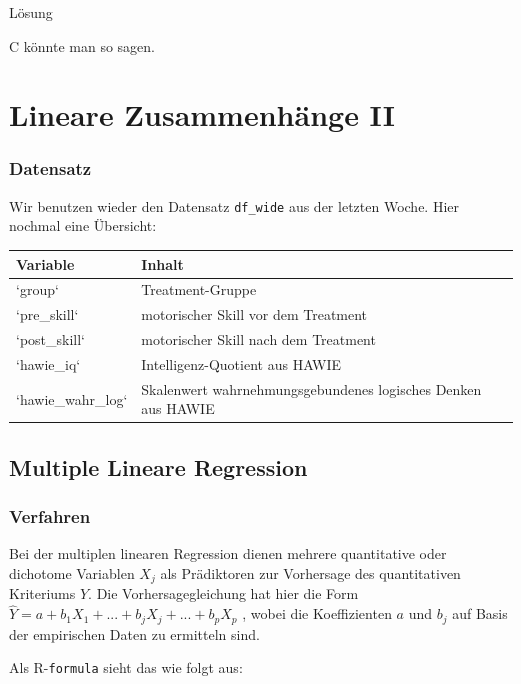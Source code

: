 \documentclass[
]{book}
\begin{document}
Lösung

C könnte man so sagen.

\hypertarget{lineare-zusammenhuxe4nge-ii}{%
\chapter{Lineare Zusammenhänge II}\label{lineare-zusammenhuxe4nge-ii}}

\hypertarget{datensatz-1}{%
\subsection{Datensatz}\label{datensatz-1}}

Wir benutzen wieder den Datensatz \texttt{df\_wide} aus der letzten Woche. Hier nochmal eine Übersicht:

\begin{tabular}[t]{ll}
\toprule
Variable & Inhalt\\
\midrule
`group` & Treatment-Gruppe\\
`pre\_skill` & motorischer Skill vor dem Treatment\\
`post\_skill` & motorischer Skill nach dem Treatment\\
`hawie\_iq` & Intelligenz-Quotient aus HAWIE\\
`hawie\_wahr\_log` & Skalenwert wahrnehmungsgebundenes 
 logisches Denken aus HAWIE\\
\bottomrule
\end{tabular}

\hypertarget{multiple-lineare-regression}{%
\section{Multiple Lineare Regression}\label{multiple-lineare-regression}}

\hypertarget{verfahren}{%
\subsection{Verfahren}\label{verfahren}}

Bei der multiplen linearen Regression dienen mehrere quantitative oder dichotome Variablen
\(X_j\) als Prädiktoren zur Vorhersage des quantitativen Kriteriums \(Y\). Die Vorhersagegleichung
hat hier die Form \(\hat{Y} = a + b_1 X_1 + ... + b_j X_ j + ... + b_p X_p\) , wobei die Koeffizienten \(a\) und \(b_j\) auf Basis der empirischen Daten zu ermitteln sind.

Als R-\texttt{formula} sieht das wie folgt aus:
\end{document}
